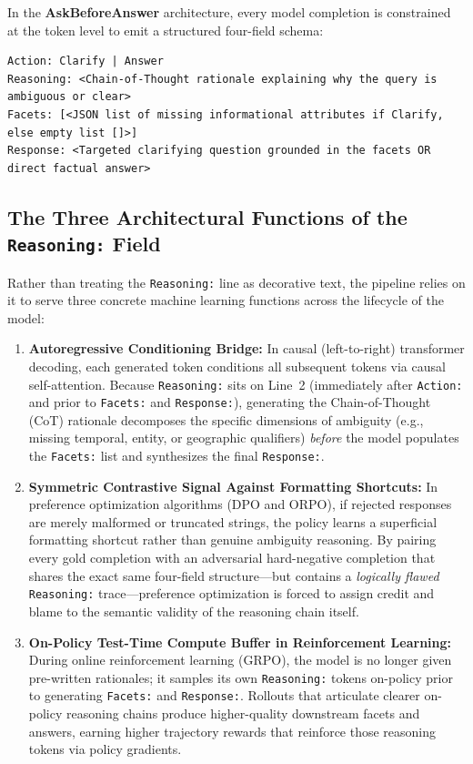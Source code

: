 \documentclass[10pt,letterpaper]{article}
\begin{document}
In the \textbf{AskBeforeAnswer} architecture, every model completion is constrained at the token level to emit a structured four-field schema:

\begin{lstlisting}
Action: Clarify | Answer
Reasoning: <Chain-of-Thought rationale explaining why the query is ambiguous or clear>
Facets: [<JSON list of missing informational attributes if Clarify, else empty list []>]
Response: <Targeted clarifying question grounded in the facets OR direct factual answer>
\end{lstlisting}

\subsection{The Three Architectural Functions of the \texttt{Reasoning:} Field}

Rather than treating the \texttt{Reasoning:} line as decorative text, the pipeline relies on it to serve three concrete machine learning functions across the lifecycle of the model:

\begin{enumerate}[leftmargin=18pt, itemsep=3pt]
    \item \textbf{Autoregressive Conditioning Bridge:} In causal (left-to-right) transformer decoding, each generated token conditions all subsequent tokens via causal self-attention. Because \texttt{Reasoning:} sits on Line~2 (immediately after \texttt{Action:} and prior to \texttt{Facets:} and \texttt{Response:}), generating the Chain-of-Thought (CoT) rationale decomposes the specific dimensions of ambiguity (e.g., missing temporal, entity, or geographic qualifiers) \textit{before} the model populates the \texttt{Facets:} list and synthesizes the final \texttt{Response:}.
    \item \textbf{Symmetric Contrastive Signal Against Formatting Shortcuts:} In preference optimization algorithms (DPO and ORPO), if rejected responses are merely malformed or truncated strings, the policy learns a superficial formatting shortcut rather than genuine ambiguity reasoning. By pairing every gold completion with an adversarial hard-negative completion that shares the exact same four-field structure---but contains a \textit{logically flawed} \texttt{Reasoning:} trace---preference optimization is forced to assign credit and blame to the semantic validity of the reasoning chain itself.
    \item \textbf{On-Policy Test-Time Compute Buffer in Reinforcement Learning:} During online reinforcement learning (GRPO), the model is no longer given pre-written rationales; it samples its own \texttt{Reasoning:} tokens on-policy prior to generating \texttt{Facets:} and \texttt{Response:}. Rollouts that articulate clearer on-policy reasoning chains produce higher-quality downstream facets and answers, earning higher trajectory rewards that reinforce those reasoning tokens via policy gradients.
\end{enumerate}
\end{document}
